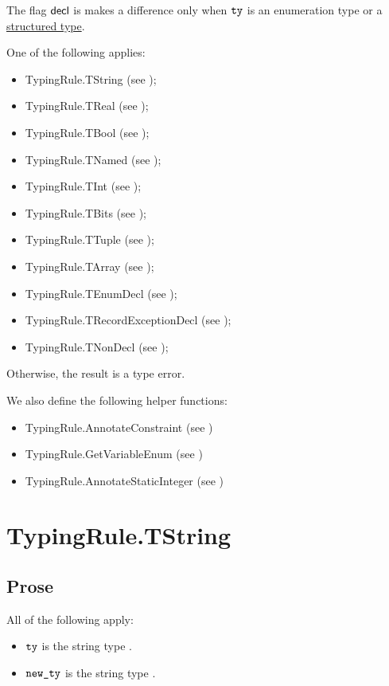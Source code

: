 \documentclass{book}
\newcommand\ProseOtherwiseTypeError[0]{Otherwise, the result is a type error.}
\newcommand\structuredtype[0]{\hyperlink{def-structuredtype}{structured type}}
\begin{document}
The flag $\textsf{decl}$ is makes a difference only when $\texttt{ty}$ is an enumeration type or a \structuredtype.

One of the following applies:
\begin{itemize}
  \item TypingRule.TString (see );
  \item TypingRule.TReal (see );
  \item TypingRule.TBool (see );
  \item TypingRule.TNamed (see );
  \item TypingRule.TInt (see );
  \item TypingRule.TBits (see );
  \item TypingRule.TTuple (see );
  \item TypingRule.TArray (see );
  \item TypingRule.TEnumDecl (see );
  \item TypingRule.TRecordExceptionDecl (see );
  \item TypingRule.TNonDecl (see );
\end{itemize}
\ProseOtherwiseTypeError

We also define the following helper functions:
\begin{itemize}
  \item TypingRule.AnnotateConstraint (see )
  \item TypingRule.GetVariableEnum (see )
  \item TypingRule.AnnotateStaticInteger (see )
\end{itemize}

\section{TypingRule.TString \label{sec:TypingRule.TString}}

\subsection{Prose}
All of the following apply:
\begin{itemize}
  \item $\texttt{ty}$ is the string type \TString.
  \item $\texttt{new\_ty}$ is the string type \TString.
\end{itemize}
\end{document}
